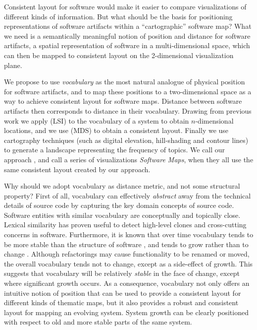 Consistent layout for software would make it easier to compare visualizations of different kinds of information. But what should be the basis for positioning representations of software artifacts within a ``cartographic'' software map?
What we need is a semantically meaningful notion of position and distance for software artifacts, a spatial representation of software in a multi-dimensional space, which can then be mapped to consistent layout on the 2-dimensional visualization plane.

We propose to use \emph{vocabulary} as the most natural analogue of physical position for software artifacts, and to map these positions to a two-dimensional space as a way to achieve consistent layout for software maps.
Distance between software artifacts then corresponds to distance in their vocabulary.
Drawing from previous work \cite{Kuhn07a,Duca06c} we apply \LSI (LSI) \cite{Deer90a} to the vocabulary of a system to obtain $n$-dimensional locations, and we use \MDS (MDS) \cite{Borg05a} to obtain a consistent layout.
Finally we use cartography techniques (such as digital elevation, hill-shading and contour lines) to generate a landscape representing the frequency of topics. We call our approach \emph{\SOCA}, and call a series of visualizations \emph{Software Maps}, when they all use the same consistent layout created by our approach. 


Why should we adopt vocabulary as distance metric, and not some structural property?
First of all, vocabulary can effectively \emph{abstract} away from the technical details of source code \cite{Kuhn07a} by capturing the key domain concepts of source code. Software entities with similar vocabulary are conceptually and topically close. Lexical similarity has proven useful to detect high-level clones \cite{Marc01a} and cross-cutting concerns \cite{Pali08a} in software. Furthermore, it is known that over time vocabulary tends to be more stable than the structure of software \cite{Anto07a}, and tends to grow rather than to change \cite{Vasa07b}. Although refactorings may cause functionality to be renamed or moved, the overall vocabulary tends not to change, except as a side-effect of growth. This suggests that vocabulary will be relatively \emph{stable} in the face of change, except where significant growth occurs. As a consequence, vocabulary not only offers an intuitive notion of position that can be used to provide a consistent layout for different kinds of thematic maps, but it also provides a robust and consistent layout for mapping an evolving system. System growth can be clearly positioned with respect to old and more stable parts of the same system.

